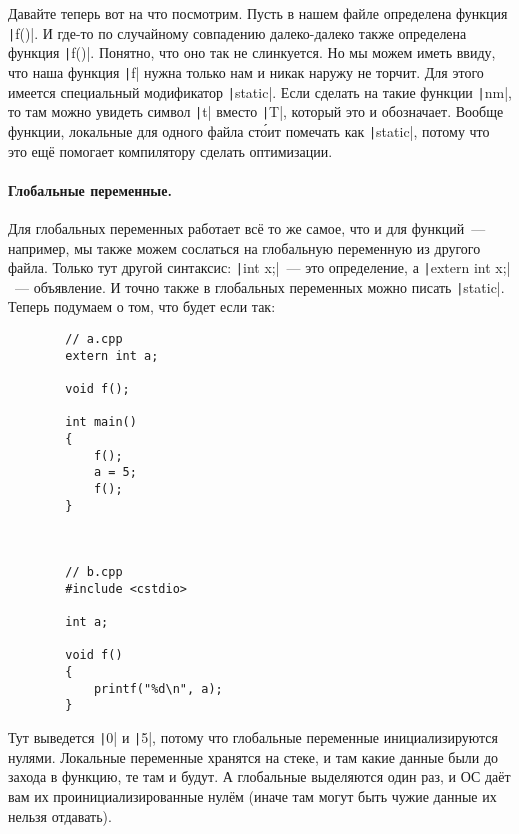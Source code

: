 \documentclass{article}
\begin{document}
    Давайте теперь вот на что посмотрим. Пусть в нашем файле определена функция \texttt|f()|. И где-то по случайному совпадению далеко-далеко также определена функция \texttt|f()|. Понятно, что оно так не слинкуется. Но мы можем иметь ввиду, что наша функция \texttt|f| нужна только нам и никак наружу не торчит. Для этого имеется специальный модификатор \texttt|static|. Если сделать на такие функции \texttt|nm|, то там можно увидеть символ \texttt|t| вместо \texttt|T|, который это и обозначает. Вообще функции, локальные для одного файла ст\'{о}ит помечать как \texttt|static|, потому что это ещё помогает компилятору сделать оптимизации.
    \paragraph{Глобальные переменные.}
    Для глобальных переменных работает всё то же самое, что и для функций~--- например, мы также можем сослаться на глобальную переменную из другого файла. Только тут другой синтаксис: \texttt|int x;|~--- это определение, а \texttt|extern int x;|~--- объявление. И точно также в глобальных переменных можно писать \texttt|static|.\\
    Теперь подумаем о том, что будет если так:
    \begin{verbatim}
        // a.cpp
        extern int a;

        void f();

        int main()
        {
            f();
            a = 5;
            f();
        }



        // b.cpp
        #include <cstdio>

        int a;

        void f()
        {
            printf("%d\n", a);
        }
    \end{verbatim}
    Тут выведется \texttt|0| и \texttt|5|, потому что глобальные переменные инициализируются нулями. Локальные переменные хранятся на стеке, и там какие данные были до захода в функцию, те там и будут. А глобальные выделяются один раз, и ОС даёт вам их проинициализированные нулём (иначе там могут быть чужие данные их нельзя отдавать).
\end{document}
